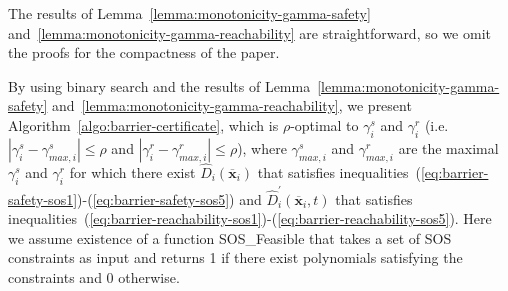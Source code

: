 \documentclass[journal]{IEEEtran}
\begin{document}
The results of Lemma~\ref{lemma:monotonicity-gamma-safety} and~\ref{lemma:monotonicity-gamma-reachability} are straightforward, so we omit the proofs for the compactness of the paper. 

By using binary search and the results of Lemma~\ref{lemma:monotonicity-gamma-safety} and~\ref{lemma:monotonicity-gamma-reachability}, we present  Algorithm~\ref{algo:barrier-certificate}, which is $\rho$-optimal to $\gamma_i^s$ and $\gamma_i^r$ (i.e. $|\gamma_i^s - \gamma_{max,i}^s| \leq \rho$ and $|\gamma_i^r - \gamma_{max,i}^r| \leq \rho$), where $\gamma_{max,i}^s$ and $\gamma_{max,i}^r$ are the maximal $\gamma_i^s$ and $\gamma_i^r$ for which there exist $\hat{D}_i(\overline{\mathbf{x}}_i)$ that satisfies inequalities~(\ref{eq:barrier-safety-sos1})-(\ref{eq:barrier-safety-sos5}) and $\hat{D}_i^{\prime}(\overline{\mathbf{x}}_i, t)$ that satisfies inequalities~(\ref{eq:barrier-reachability-sos1})-(\ref{eq:barrier-reachability-sos5}). Here we assume existence of a function SOS\_Feasible that takes a set of SOS constraints as input and returns 1 if there exist polynomials satisfying the constraints and $0$ otherwise.
 
\end{document}
